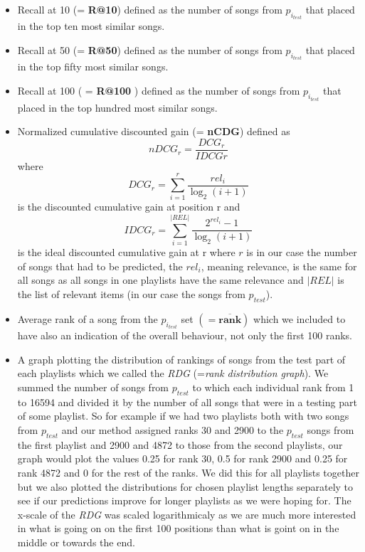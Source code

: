 \begin{itemize}
    \item Recall at 10 (= \textbf{R@10}) defined as the number of songs from $p_{i_{test}} $ that placed in the top ten most similar songs.
    \item Recall at 50 (= \textbf{R@50}) defined as the number of songs from $p_{i_{test}} $ that placed in the top fifty most similar songs.
    \item Recall at 100 ( = \textbf{R@100} ) defined as the number of songs from $p_{i_{test}} $ that placed in the top hundred most similar songs.
    \item Normalized cumulative discounted gain (= \textbf{nCDG}) defined as 
    $${nDCG_{r}} = \frac{DCG_{r}}{IDCG{r}} $$
    where 
    $${DCG_{r}} =\sum_{i=1}^{r}{\frac {rel_{i}}{\log _{2}(i+1)}} $$ 
    is the discounted cumulative gain at position r and 
    $$ {IDCG_{r}} =\sum _{i=1}^{|REL|}{\frac {2^{rel_{i}}-1}{\log _{2}(i+1)}} $$
    is the ideal discounted cumulative gain at r
    where $r$ is in our case the number of songs that had to be predicted, the $rel_i$, meaning relevance, is the same for all songs as all songs in one playlists have the same relevance and $|REL|$ is the list of relevant items (in our case the songs from $p_{test}$).
    \item Average rank of a song from the $p_{i_{test}}$ set $ \boldsymbol{ (= \overline{rank})} $ which we included to have also an indication of the overall behaviour, not only the first 100 ranks.
    \item A graph plotting the distribution of rankings of songs from the test part of each playlists which we called the \textit{RDG} (=\textit{rank distribution graph}). We summed the number of songs from $p_{test}$ to which each individual rank from 1 to 16594 and divided it by the number of all songs that were in a testing part of some playlist. So for example if we had two playlists both with two songs from $p_{test}$ and our method assigned ranks 30 and 2900 to the $p_{test}$ songs from the first playlist and 2900 and 4872 to those from the second playlists, our graph would plot the values 0.25 for rank 30, 0.5 for rank 2900 and 0.25 for rank 4872 and 0 for the rest of the ranks. We did this for all playlists together but we also plotted the distributions for chosen playlist lengths separately to see if our predictions improve for longer playlists as we were hoping for. The x-scale of the \textit{RDG} was scaled logarithmicaly as we are much more interested in what is going on on the first 100 positions than what is goint on in the middle or towards the end. \\
\end{itemize}
